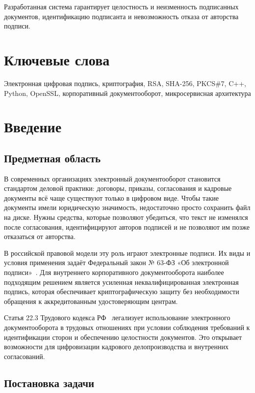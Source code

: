 \documentclass[a4paper,12pt]{extarticle}
\begin{document}
Разработанная система гарантирует целостность и неизменность подписанных документов, идентификацию подписанта и невозможность отказа от авторства подписи.



\section*{Ключевые слова}
Электронная цифровая подпись, криптография, RSA, SHA-256, PKCS\#7, C++, Python, OpenSSL, корпоративный документооборот, микросервисная архитектура

\pagebreak

\section{Введение}

\subsection{Предметная область}

В современных организациях электронный документооборот становится стандартом деловой практики: договоры, приказы, согласования и кадровые документы всё чаще существуют только в цифровом виде. Чтобы такие документы имели юридическую значимость, недостаточно просто сохранить файл на диске. Нужны средства, которые позволяют убедиться, что текст не изменялся после согласования, идентифицируют авторов подписей и не позволяют им позже отказаться от авторства.

В российской правовой модели эту роль играют электронные подписи. Их виды и условия применения задаёт Федеральный закон № 63-ФЗ «Об электронной подписи»~\cite{fz63}. Для внутреннего корпоративного документооборота наиболее подходящим решением является усиленная неквалифицированная электронная подпись, которая обеспечивает криптографическую защиту без необходимости обращения к аккредитованным удостоверяющим центрам.

Статья 22.3 Трудового кодекса РФ~\cite{tk_rf} легализует использование электронного документооборота в трудовых отношениях при условии соблюдения требований к идентификации сторон и обеспечению целостности документов. Это открывает возможности для цифровизации кадрового делопроизводства и внутренних согласований.


\subsection{Постановка задачи}
\end{document}
